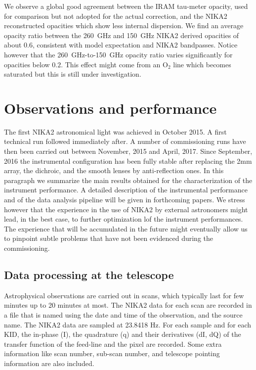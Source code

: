 \documentclass[]{aa} %
\begin{document}
We observe a global good agreement between the IRAM tau-meter opacity,
used for comparison but not adopted for the actual correction, and the
NIKA2 reconstructed opacities which show less internal dispersion. We
find an average opacity ratio between the 260~GHz and 150~GHz NIKA2
derived opacities of about 0.6, consistent with model expectation and
NIKA2 bandpasses. Notice however that the 260~GHz-to-150~GHz opacity
ratio varies significantly for opacities below $0.2$. This effect
might come from an O$_2$ line which becomes saturated but this is still
under investigation.

\section{Observations and performance}
\label{Observations and performance}

The first NIKA2 astronomical light was achieved in October 2015. A first technical run followed immediately after. A number of commissioning runs have then been carried out between November, 2015 and April, 2017. Since September, 2016 the instrumental configuration has been fully stable after replacing the 2mm array, the dichroic, and the smooth lenses by anti-reflection ones.
In this paragraph we summarize the main results obtained for the characterization of the instrument performance. A detailed description of the instrumental performance and of the data analysis pipeline will be given in forthcoming papers. We stress however that the experience in the use of NIKA2 by external astronomers might lead, in the best case, to further optimization lof the instrument performances. The experience that will be accumulated in the future might eventually allow us to pinpoint subtle problems that have not been evidenced during the commissioning. 

\subsection{Data processing at the telescope}
\label{Data processing at the telescope}

Astrophysical observations are carried out in scans, which typically last for few minutes up to 20 minutes at most.
The NIKA2 data for each scan are recorded in a file that is named using the date and time of the observation, and
the source name. The NIKA2 data are sampled at 23.8418 Hz. For each sample and for each KID, the in-phase (I), the quadrature
(q) and their derivatives (dI, dQ) of the transfer function of the feed-line and the pixel are recorded.
Some extra information like scan number, sub-scan number, and telescope pointing information are also included. \\
\end{document}

